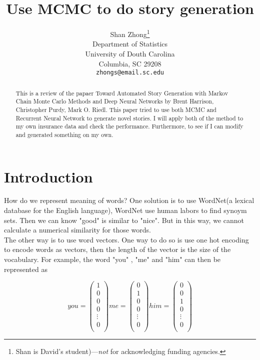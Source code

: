 \documentclass{article}
\title{Use MCMC to do story generation}
\author{
  Shan Zhong\thanks{Shan is David's student)---\emph{not} for acknowledging funding agencies.} \\
  Department of Statistics\\
  University of Douth Carolina\\
  Columbia, SC 29208\\
  \texttt{zhongs@email.sc.edu} \\
}
\begin{document}
\maketitle

\begin{abstract}
This is a review of the papaer Toward Automated Story Generation with Markov Chain Monte Carlo Methods and Deep Neural Networks by Brent Harrison, Christopher Purdy, Mark O. Riedl. This paper tried to use both MCMC and Recurrent Neural Network to generate novel stories. I will apply both of the method to my own insurance data and check the performance. Furthermore, to see if I can modify and generated something on my own.
\end{abstract}




\section{Introduction}
How do we represent meaning of words? One solution is to use WordNet(a lexical database for the English language), WordNet use human labors to find synoym sets.  Then we can know "good" is similar to "nice".  But in this way, we cannot calculate a numerical similarity for those words. 
$$$$
The other way is to use word vectors. One way to do so is use one hot encoding to encode words as vectors, then the length of the vector is the size of the vocabulary. For example, the word "you" , "me" and "him" can then be represented as

$$
you =
\begin{pmatrix}
1 \\
0 \\
0 \\
0\\
\vdots \\
0 \\
\end{pmatrix}
me=
\begin{pmatrix}
0 \\
1\\
0 \\
0\\
\vdots \\
0 \\
\end{pmatrix}
him=
\begin{pmatrix}
0 \\
0\\
1 \\
0\\
\vdots \\
0 \\
\end{pmatrix}
$$
\end{document}
